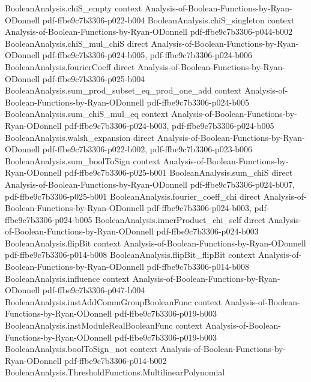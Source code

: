 \begin{lemma}
  {BooleanAnalysis.chiS_empty}
  {context}
  {Analysis-of-Boolean-Functions-by-Ryan-ODonnell}
  {pdf-ffbe9c7b3306-p022-b004}
\proofstep
  {BooleanAnalysis.chiS_singleton}
  {context}
  {Analysis-of-Boolean-Functions-by-Ryan-ODonnell}
  {pdf-ffbe9c7b3306-p044-b002}
\proofstep
  {BooleanAnalysis.chiS_mul_chiS}
  {direct}
  {Analysis-of-Boolean-Functions-by-Ryan-ODonnell}
  {pdf-ffbe9c7b3306-p024-b005,
    pdf-ffbe9c7b3306-p024-b006}
\proofstep
  {BooleanAnalysis.fourierCoeff}
  {direct}
  {Analysis-of-Boolean-Functions-by-Ryan-ODonnell}
  {pdf-ffbe9c7b3306-p025-b004}
\proofstep
  {BooleanAnalysis.sum_prod_subset_eq_prod_one_add}
  {context}
  {Analysis-of-Boolean-Functions-by-Ryan-ODonnell}
  {pdf-ffbe9c7b3306-p024-b005}
\proofstep
  {BooleanAnalysis.sum_chiS_mul_eq}
  {context}
  {Analysis-of-Boolean-Functions-by-Ryan-ODonnell}
  {pdf-ffbe9c7b3306-p024-b003,
    pdf-ffbe9c7b3306-p024-b005}
\proofstep
  {BooleanAnalysis.walsh_expansion}
  {direct}
  {Analysis-of-Boolean-Functions-by-Ryan-ODonnell}
  {pdf-ffbe9c7b3306-p022-b002,
    pdf-ffbe9c7b3306-p023-b006}
\proofstep
  {BooleanAnalysis.sum_boolToSign}
  {context}
  {Analysis-of-Boolean-Functions-by-Ryan-ODonnell}
  {pdf-ffbe9c7b3306-p025-b001}
\proofstep
  {BooleanAnalysis.sum_chiS}
  {direct}
  {Analysis-of-Boolean-Functions-by-Ryan-ODonnell}
  {pdf-ffbe9c7b3306-p024-b007,
    pdf-ffbe9c7b3306-p025-b001}
\proofstep
  {BooleanAnalysis.fourier_coeff_chi}
  {direct}
  {Analysis-of-Boolean-Functions-by-Ryan-ODonnell}
  {pdf-ffbe9c7b3306-p024-b003,
    pdf-ffbe9c7b3306-p024-b005}
\proofstep
  {BooleanAnalysis.innerProduct_chi_self}
  {direct}
  {Analysis-of-Boolean-Functions-by-Ryan-ODonnell}
  {pdf-ffbe9c7b3306-p024-b003}
\proofstep
  {BooleanAnalysis.flipBit}
  {context}
  {Analysis-of-Boolean-Functions-by-Ryan-ODonnell}
  {pdf-ffbe9c7b3306-p014-b008}
\proofstep
  {BooleanAnalysis.flipBit_flipBit}
  {context}
  {Analysis-of-Boolean-Functions-by-Ryan-ODonnell}
  {pdf-ffbe9c7b3306-p014-b008}
\proofstep
  {BooleanAnalysis.influence}
  {context}
  {Analysis-of-Boolean-Functions-by-Ryan-ODonnell}
  {pdf-ffbe9c7b3306-p047-b004}
\proofstep
  {BooleanAnalysis.instAddCommGroupBooleanFunc}
  {context}
  {Analysis-of-Boolean-Functions-by-Ryan-ODonnell}
  {pdf-ffbe9c7b3306-p019-b003}
\proofstep
  {BooleanAnalysis.instModuleRealBooleanFunc}
  {context}
  {Analysis-of-Boolean-Functions-by-Ryan-ODonnell}
  {pdf-ffbe9c7b3306-p019-b003}
\proofstep
  {BooleanAnalysis.boolToSign_not}
  {context}
  {Analysis-of-Boolean-Functions-by-Ryan-ODonnell}
  {pdf-ffbe9c7b3306-p014-b002}
\proofstep
  {BooleanAnalysis.ThresholdFunctions.MultilinearPolynomial}

\end{lemma}
